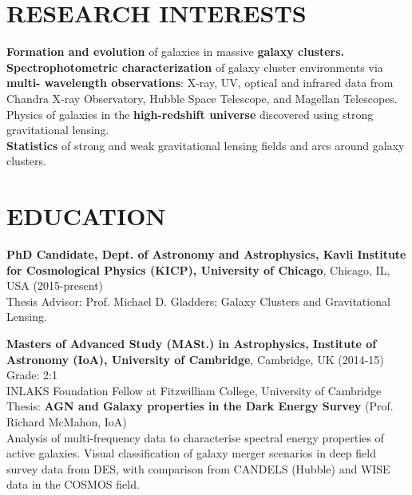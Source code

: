 \documentclass[margin]{res}
\begin{document}
\begin{resume}

\section{RESEARCH INTERESTS}
{\bf Formation and evolution} of galaxies in massive {\bf galaxy clusters.}\\
{\bf Spectrophotometric characterization} of galaxy cluster environments via {\bf multi- wavelength observations}: X-ray, UV, optical and infrared data from Chandra X-ray Observatory, Hubble Space Telescope, and Magellan Telescopes.\\
Physics of galaxies in the {\bf high-redshift universe} discovered using strong gravitational lensing.\\
{\bf Statistics} of strong and weak gravitational lensing fields and arcs around galaxy clusters.

\section{EDUCATION}
\textbf{PhD Candidate, Dept. of Astronomy and Astrophysics, Kavli Institute for Cosmological Physics (KICP), University of Chicago}, Chicago, IL, USA (2015-present)\\
Thesis Advisor: Prof. Michael D. Gladders; Galaxy Clusters and Gravitational Lensing.

\textbf{Masters of Advanced Study (MASt.) in Astrophysics, Institute of Astronomy (IoA), University of Cambridge}, Cambridge, UK (2014-15) \hfill 
Grade: 2:1\\
INLAKS Foundation Fellow at Fitzwilliam College, University of Cambridge\\
Thesis: \textbf{AGN and Galaxy properties in the Dark Energy Survey} (Prof. Richard McMahon, IoA)\\
Analysis of multi-frequency data to characterise spectral energy properties of active galaxies. Visual classification of galaxy merger scenarios in deep field survey data from DES, with comparison from CANDELS (Hubble) and WISE data in the COSMOS field.


\end{resume}
\end{document}
